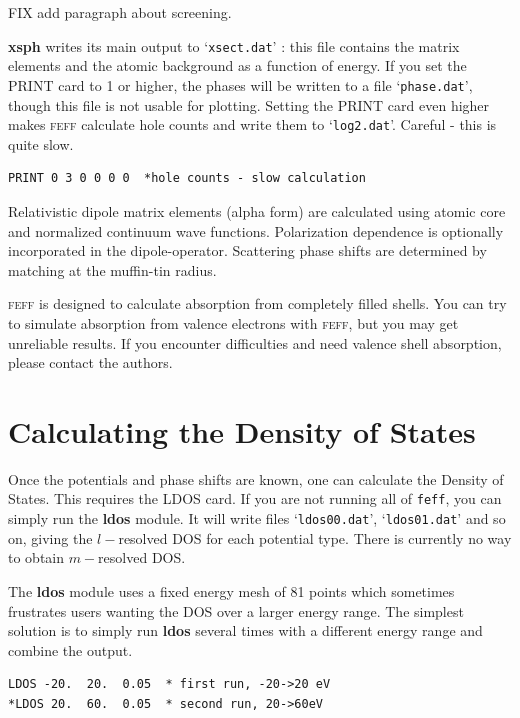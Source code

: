 \documentclass[11pt,oneside]{report} %
\newcommand{\program}[1]{\textsc{#1}}
\newcommand{\feff}{\program{feff}}
\newcommand{\file}[1]{`\texttt{#1}'}
\newcommand{\module}[1]{\textrm{\bf{#1}}}
\begin{document}
FIX add paragraph about screening.


\module{xsph} writes its main output to \file{xsect.dat} : this file contains the matrix elements and the atomic background as a function of energy.
If you set the PRINT card to 1 or higher, the phases will be written to a file \file{phase.dat}, though this file is not
usable for plotting.  Setting the PRINT card even higher makes {\feff} calculate hole counts and write them to \file{log2.dat}.  Careful - this is quite slow.
\begin{verbatim}
PRINT 0 3 0 0 0 0  *hole counts - slow calculation
\end{verbatim}

Relativistic dipole matrix elements (alpha form) are calculated using
atomic core and normalized continuum wave functions. Polarization
dependence is optionally incorporated in the dipole-operator.
Scattering phase shifts are determined by matching at the muffin-tin
radius. 

{\feff} is designed to calculate absorption from completely filled
shells. You can try to simulate absorption from valence electrons
with {\feff}, but you may get unreliable results. If you
encounter difficulties and need valence shell absorption, please
contact the authors.



\section{Calculating the Density of States}
Once the potentials and phase shifts are known, one can calculate the Density of States.  This requires the LDOS card.  If you are not
running all of \texttt{feff}, you can simply run the \module{ldos} module.  It will write files \file{ldos00.dat}, \file{ldos01.dat} and so on, giving
the $l-$resolved DOS for each potential type.  There is currently no way to obtain $m-$resolved DOS.

The \module{ldos} module uses a fixed energy mesh of 81 points which sometimes frustrates users wanting the DOS over a larger energy range.
The simplest solution is to simply run \module{ldos} several times with a different energy range and combine the output.
\begin{verbatim}
LDOS -20.  20.  0.05  * first run, -20->20 eV
*LDOS 20.  60.  0.05  * second run, 20->60eV
\end{verbatim}
\end{document}
